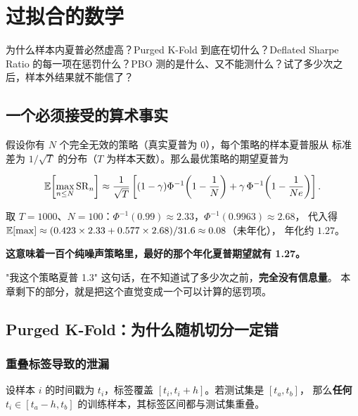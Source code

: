 \chapter{过拟合的数学}\label{ch:overfit}

\begin{keybox}[本章要回答的问题]
为什么样本内夏普必然虚高？Purged K-Fold 到底在切什么？Deflated Sharpe Ratio
的每一项在惩罚什么？PBO 测的是什么、又不能测什么？试了多少次之后，样本外结果就不能信了？
\end{keybox}

\section{一个必须接受的算术事实}

假设你有 $N$ 个完全无效的策略（真实夏普为 0），每个策略的样本夏普服从
标准差为 $1/\sqrt{T}$ 的分布（$T$ 为样本天数）。那么最优策略的期望夏普为

\begin{equation}
  \mathbb{E}\!\left[\max_{n\le N}\mathrm{SR}_n\right]
  \approx \frac{1}{\sqrt{T}}\left[(1-\gamma)\Phi^{-1}\!\left(1-\frac1N\right)
  + \gamma\,\Phi^{-1}\!\left(1-\frac{1}{Ne}\right)\right].
  \label{eq:emax2}
\end{equation}

取 $T=1000$、$N=100$：$\Phi^{-1}(0.99)\approx 2.33$，$\Phi^{-1}(0.9963)\approx 2.68$，
代入得 $\mathbb{E}[\max]\approx (0.423\times2.33 + 0.577\times2.68)/31.6 \approx 0.08$（未年化），
年化约 $1.27$。

\textbf{这意味着一百个纯噪声策略里，最好的那个年化夏普期望就有 1.27。}

\begin{warnbox}[所以]
"我这个策略夏普 1.3" 这句话，在不知道试了多少次之前，\textbf{完全没有信息量}。
本章剩下的部分，就是把这个直觉变成一个可以计算的惩罚项。
\end{warnbox}

\section{Purged K-Fold：为什么随机切分一定错}

\subsection{重叠标签导致的泄漏}

设样本 $i$ 的时间戳为 $t_i$，标签覆盖 $[t_i, t_i+h]$。若测试集是 $[t_a, t_b]$，
那么\textbf{任何} $t_i \in [t_a - h, t_b]$ 的训练样本，其标签区间都与测试集重叠。

